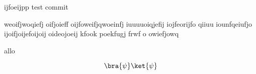 \documentclass[letterpaper,oneside,final]{tufte-handout}
\begin{document}
ijfoeijpp 
test commit 


weoifjwoqiefj oifjoieff oijfoweifjqwoeinfj iuuuuoiqjefij iojfeorijfo qiiuu      iounfqeiufjo ijoifjoijefoijoij  oideojoeij
kfook poekfugj frwf o
 owiefjowq\\
\begin{note}
    allo
\end{note}
\[
\bra{\psi} \ket{\psi} 
\]


 


\end{document}
